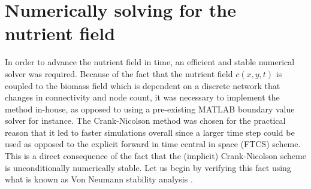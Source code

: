 \section{Numerically solving for the nutrient field} \label{Crank_Nicholson}
In order to advance the nutrient field in time, an efficient and stable numerical solver
was required. Because of the fact that the nutrient field $c(x,y,t)$ is coupled 
to the biomass field which is dependent on a discrete network that changes in connectivity and 
node count, it was necessary to implement the method in-house, as opposed to 
using a pre-existing MATLAB boundary value solver for instance. The Crank-Nicolson method \cite{crank1947practical} was 
chosen for the practical reason that it led to faster simulations overall since a larger
time step could be used as opposed to the explicit forward in time central in space (FTCS) scheme. This 
is a direct consequence of the fact that the (implicit) Crank-Nicolson scheme is unconditionally numerically 
stable. Let us begin by verifying this fact using what is
known as Von Neumann stability analysis \cite{charney1950numerical}.
\\

